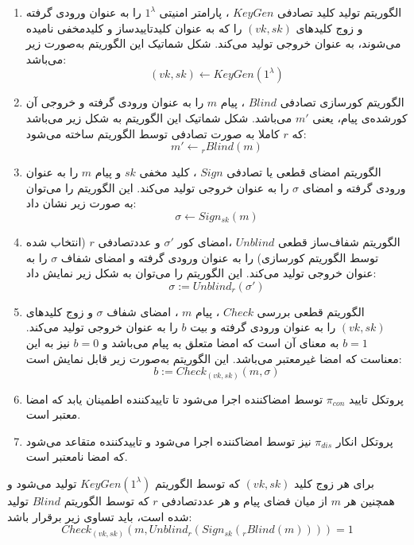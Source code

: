 \documentclass[12pt,a4paper]{article}
\begin{document}
\begin{enumerate}
	\item 
الگوریتم تولید کلید تصادفی 
$KeyGen$
، پارامتر امنیتی
$1^\lambda$
را به عنوان ورودی گرفته و زوج کلیدهای
$(vk,sk)$
را که به عنوان کلیدتاییدساز و کلید‌مخفی نامیده می‌شوند، به عنوان خروجی تولید می‌کند. شکل شماتیک این الگوریتم به‌صورت زیر می‌باشد:
$$ (vk,sk) \longleftarrow KeyGen(1^{\lambda}) $$

\item 
الگوریتم کورسازی تصادفی
$Blind$
، پیام 
$m$
را به عنوان ورودی گرفته و خروجی آن کورشده‌ی پیام، یعنی
$m'$
می‌باشد. شکل شماتیک این الگوریتم به شکل زیر می‌باشد که 
$r$
کاملا به صورت تصادفی توسط الگوریتم ساخته
می‌شود:
$$ m' \longleftarrow {_{r}Blind(m)} $$

\item
الگوریتم امضای قطعی یا تصادفی 
$Sign$
، کلید مخفی
$sk$
و پیام
$m$
را به عنوان ورودی گرفته و امضای
$\sigma$
را به عنوان خروجی تولید می‌کند. این الگوریتم را می‌توان به صورت زیر نشان داد:
$$ \sigma \longleftarrow Sign_{sk}(m) $$

\item 
الگوریتم شفاف‌ساز قطعی 
$Unblind$
،امضای کور
$\sigma'$
و عددتصادفی 
$r$
(انتخاب شده توسط الگوریتم کورسازی) را به عنوان ورودی گرفته و امضای شفاف
$\sigma$
را به عنوان خروجی تولید می‌کند. این الگوریتم را می‌توان به شکل زیر نمایش داد:
$$ \sigma := Unblind_r(\sigma') $$

\item 
الگوریتم قطعی بررسی 
$Check$
، پیام 
$m$
، امضای شفاف
$\sigma$
و زوج کلیدهای
$(vk,sk)$
را به عنوان ورودی گرفته و بیت 
$b$
را به عنوان خروجی تولید می‌کند.
$b=1$
به معنای آن است که امضا متعلق به پیام می‌باشد و 
$b=0$
نیز به این معناست که امضا غیرمعتبر می‌باشد. این الگوریتم به‌صورت زیر قابل نمایش است:
$$ b := Check_{(vk,sk)}(m,\sigma) $$

\item
پروتکل تایید
$\pi_{con}$
توسط امضاکننده اجرا می‌شود تا تاییدکننده اطمینان یابد که امضا معتبر است.

\item 
پروتکل انکار
$\pi_{dis}$
نیز توسط امضاکننده اجرا می‌شود و تاییدکننده متقاعد می‌شود که امضا نامعتبر است.
\end{enumerate}

برای هر زوج کلید 
$(vk,sk)$
که توسط الگوریتم 
$KeyGen(1^{\lambda})$
تولید می‌شود و همچنین هر
$m$
از میان فضای پیام و هر عددتصادفی
$r$
که توسط الگوریتم 
$Blind$
تولید شده است، باید تساوی زیر برقرار باشد:
$$ Check_{(vk,sk)}(m,Unblind_r(Sign_{sk}(_{r}Blind(m)))) = 1 $$
\end{document}

